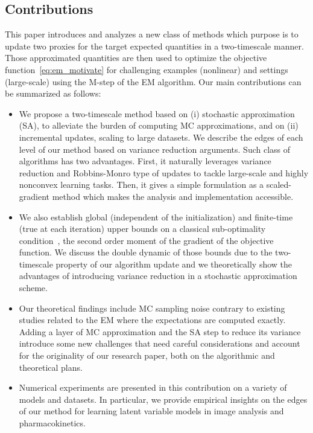 \documentclass[bj]{imsart}
\numberwithin{equation}{section}
\theoremstyle{plain}
\begin{document}
\subsection{Contributions}
This paper introduces and analyzes a new class of methods which purpose is to update two proxies for the target expected quantities in a two-timescale manner. 
Those approximated quantities are then used to optimize the objective function~\eqref{eq:em_motivate} for challenging examples (nonlinear) and settings (large-scale) using the {M-step} of the EM algorithm.
Our main contributions can be summarized as follows:
\begin{itemize}
\item We propose a two-timescale method based on (i) stochastic approximation (SA), to alleviate the burden of computing MC approximations, and on (ii) incremental updates, scaling to large datasets. We describe the edges of each level of our method based on variance reduction arguments. Such class of algorithms has two advantages. First, it naturally leverages variance reduction and Robbins-Monro type of updates to tackle large-scale and highly nonconvex learning tasks. Then, it gives a simple formulation as a {scaled-gradient method} which makes the analysis and implementation accessible.
\item We also establish global (independent of the initialization) and finite-time (true at each iteration) upper bounds on a classical sub-optimality condition~\citep{jain2017non, ghadimi2013stochastic}, \ie the second order moment of the gradient of the objective function. 
We discuss the double dynamic of those bounds due to the two-timescale property of our algorithm update and we theoretically show the advantages of introducing variance reduction in a {stochastic approximation}~\citep{robbins1951stochastic} scheme.
\item Our theoretical findings include MC sampling noise contrary to existing studies related to the EM where the expectations are computed exactly. 
Adding a layer of MC approximation and the SA step to reduce its variance introduce some new challenges that need careful considerations and account for the originality of our research paper, both on the algorithmic and theoretical plans.
\item Numerical experiments are presented in this contribution on a variety of models and datasets. 
In particular, we provide empirical insights on the edges of our method for learning latent variable models in image analysis and pharmacokinetics.
\end{itemize}
\end{document}
